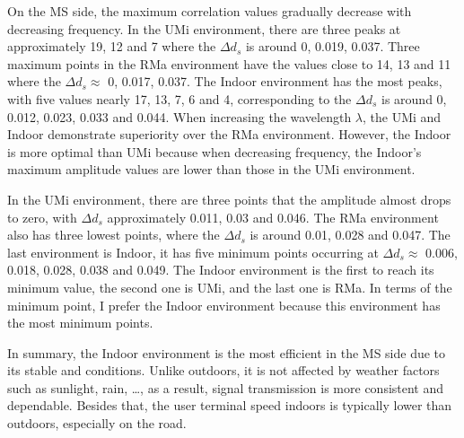 \documentclass{article} %
\begin{document}
On the MS side, the maximum correlation values gradually decrease with decreasing frequency. In the UMi environment, there are three peaks at approximately 19, 12 and 7 where the $\Delta d_s$ is around 0, 0.019, 0.037. Three maximum points in the RMa environment have the values close to 14, 13 and 11 where the $\Delta d_s \approx$ 0, 0.017, 0.037. The Indoor environment has the most peaks, with five values nearly 17, 13, 7, 6 and 4, corresponding to the $\Delta d_s$ is around 0, 0.012, 0.023, 0.033 and 0.044. When increasing the wavelength $\lambda$, the UMi and Indoor demonstrate superiority over the RMa environment. However, the Indoor is more optimal than UMi because when decreasing frequency, the Indoor’s maximum amplitude values are lower than those in the UMi environment.

In the UMi environment, there are three points that the amplitude almost drops to zero, with $\Delta d_s$ approximately 0.011, 0.03 and 0.046. The RMa environment also has three lowest points, where the $\Delta d_s$ is around 0.01, 0.028 and 0.047. The last environment is Indoor, it has five minimum points occurring at $\Delta d_s \approx$ 0.006, 0.018, 0.028, 0.038 and 0.049. The Indoor environment is the first to reach its minimum value, the second one is UMi, and the last one is RMa. In terms of the minimum point, I prefer the Indoor environment because this environment has the most minimum points.

In summary, the Indoor environment is the most efficient in the MS side due to its stable and conditions. Unlike outdoors, it is not affected by weather factors such as sunlight, rain, \dots, as a result, signal transmission is more consistent and dependable. Besides that, the user terminal speed indoors is typically lower than outdoors, especially on the road.

\clearpage

\end{document}
